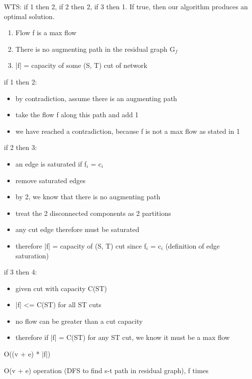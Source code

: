 {
    \item WTS: if 1 then 2, if 2 then 2, if 3 then 1. If true, then our algorithm produces an optimal solution.
    \begin{enumerate}
        \item Flow f is a max flow
        \item There is no augmenting path in the residual graph G$_f$
        \item |f| = capacity of some (S, T) cut of network
    \end{enumerate}
    \item if 1 then 2:
    \begin{itemize}
        \item by contradiction, assume there is an augmenting path 
        \item take the flow f along this path and add 1
        \item we have reached a contradiction, because f is not a max flow as stated in 1
    \end{itemize}
    \item if 2 then 3:
    \begin{itemize}
        \item an edge is saturated if f$_i$ = c$_i$
        \item remove saturated edges
        \item by 2, we know that there is no augmenting path 
        \item treat the 2 disconnected components as 2 partitions
        \item any cut edge therefore must be saturated 
        \item therefore |f| = capacity of (S, T) cut since f$_i$ = c$_i$ (definition of edge saturation)
    \end{itemize}
    \item if 3 then 4:
    \begin{itemize}
        \item given cut with capacity C(ST)
        \item |f| <= C(ST) for all ST cuts
        \item no flow can be greater than a cut capacity
        \item therefore if |f| = C(ST) for any ST cut, we know it must be a max flow
        
    \end{itemize}
}
{
    \item O((v + e) * |f|) 
    \item O(v + e) operation (DFS to find s-t path in residual graph), f times
    
}


